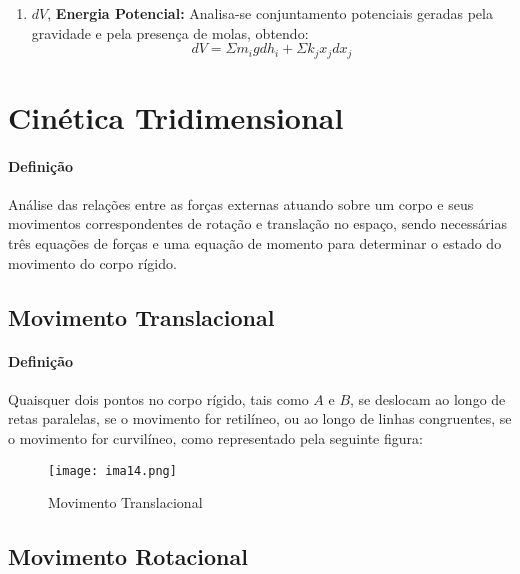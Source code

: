 \documentclass{article}
\begin{document}
\begin{enumerate}[rightmargin = \leftmargin, noitemsep]
                    \item $dV$, \textbf{Energia Potencial:} Analisa-se conjuntamento potenciais geradas pela gravidade e pela presença de molas, obtendo:
                        \begin{equation}
                            \boxed{
                                dV = 
                                \Sigma m_{i} g d h_{i} +
                                \Sigma k_{j} x_{j} d x_{j}
                            }
                        \end{equation}
                \end{enumerate}
\newpage

    \section{Cinética Tridimensional}
        \paragraph{Definição}Análise das relações entre as forças externas atuando sobre um corpo e seus movimentos correspondentes de rotação e translação no espaço, sendo necessárias três equações de forças e uma equação de momento para determinar o estado do movimento do corpo rígido.

        \subsection{Movimento Translacional}
            \paragraph{Definição}Quaisquer dois pontos no corpo rígido, tais como $A$ e $B$, se deslocam ao longo de retas paralelas, se o movimento for retilíneo, ou ao longo de linhas congruentes, se o movimento for curvilíneo, como representado pela seguinte figura:
                \begin{figure}[H]
                    \centering
                    \texttt{[image: ima14.png]}
                    \caption{Movimento Translacional}
                \end{figure}\noindent

        \subsection{Movimento Rotacional}
\end{document}
